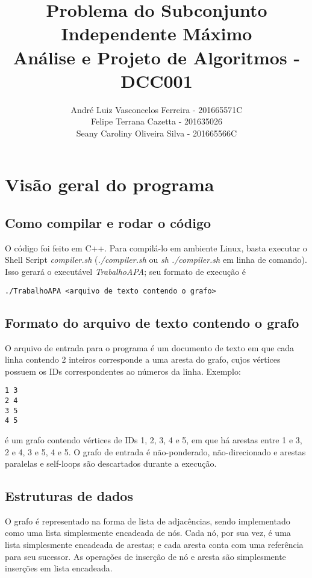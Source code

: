 \documentclass{article}
\title{Problema do Subconjunto Independente Máximo \\ \large Análise e Projeto de Algoritmos - DCC001}
\author{André Luiz Vasconcelos Ferreira - 201665571C \\ Felipe Terrana Cazetta - 201635026 \\ Seany Caroliny Oliveira Silva - 201665566C}
\date{}
\begin{document}
\maketitle

\newpage

\section{Visão geral do programa}
\subsection{Como compilar e rodar o código}
O código foi feito em C++. Para compilá-lo em ambiente Linux, basta executar o Shell Script \textit{compiler.sh} (\textit{./compiler.sh} ou \textit{sh ./compiler.sh} em linha de comando). Isso gerará o executável \textit{TrabalhoAPA}; seu formato de execução é
\begin{lstlisting}
./TrabalhoAPA <arquivo de texto contendo o grafo>
\end{lstlisting}



\subsection{Formato do arquivo de texto contendo o grafo}
O arquivo de entrada para o programa é um documento de texto em que cada linha contendo 2 inteiros corresponde a uma aresta do grafo, cujos vértices possuem os IDs correspondentes ao números da linha. Exemplo:
\begin{lstlisting}
1 3
2 4
3 5
4 5
\end{lstlisting}
é um grafo contendo vértices de IDs 1, 2, 3, 4 e 5, em que há arestas entre 1 e 3, 2 e 4, 3 e 5, 4 e 5. O grafo de entrada é não-ponderado, não-direcionado e arestas paralelas e self-loops são descartados durante a execução.


\subsection{Estruturas de dados}
O grafo é representado na forma de lista de adjacências, sendo implementado como uma lista simplesmente encadeada de nós. Cada nó, por sua vez, é uma lista simplesmente encadeada de arestas; e cada aresta conta com uma referência para seu sucessor. As operações de inserção de nó e aresta são simplesmente inserções em lista encadeada.
\end{document}
